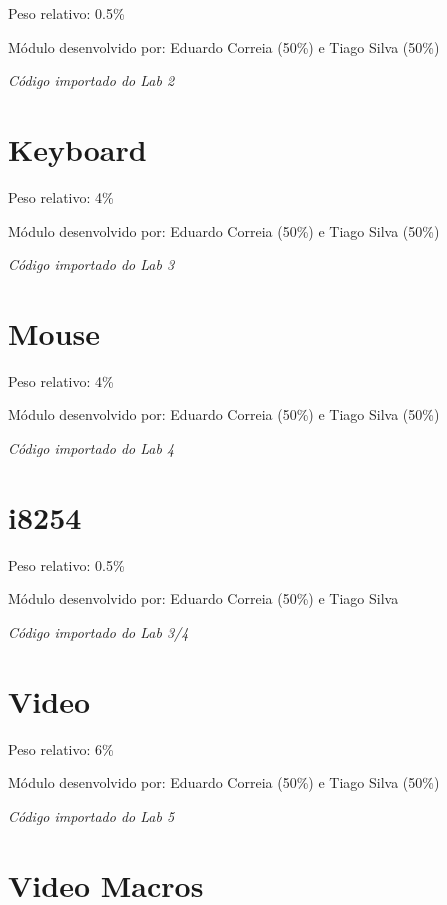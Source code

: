 \documentclass{report}
\begin{document}
Peso relativo: 0.5\%

Módulo desenvolvido por: Eduardo Correia (50\%) e Tiago Silva (50\%)
\newline

\textit{Código importado do Lab 2}\footnotemark

\section{Keyboard}

Peso relativo: 4\%

Módulo desenvolvido por: Eduardo Correia (50\%) e Tiago Silva (50\%)
\newline

\textit{Código importado do Lab 3}\footnotemark[\value{footnote}]

\section{Mouse}

Peso relativo: 4\%

Módulo desenvolvido por: Eduardo Correia (50\%) e Tiago Silva (50\%)
\newline

\textit{Código importado do Lab 4}\footnotemark[\value{footnote}]

\section{i8254}

Peso relativo: 0.5\%

Módulo desenvolvido por: Eduardo Correia (50\%) e Tiago Silva
\newline

\textit{Código importado do Lab 3/4}\footnotemark[\value{footnote}]

\section{Video}

Peso relativo: 6\%

Módulo desenvolvido por: Eduardo Correia (50\%) e Tiago Silva (50\%)
\newline

\textit{Código importado do Lab 5}\footnotemark[\value{footnote}]

\section{Video Macros}
\end{document}
